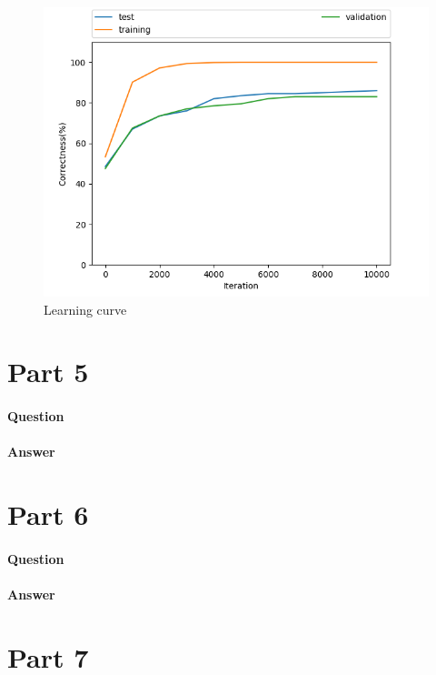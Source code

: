 \documentclass[11pt,twoside]{article}
\begin{document}
\begin{figure}[h]
	\centering
	\includegraphics[scale=0.8]{part4.png}
	\caption*{Learning curve}
\end{figure}

\clearpage

\section*{Part 5}
\paragraph{Question}


\paragraph{Answer}

\clearpage

\section*{Part 6}
\paragraph{Question}

\paragraph{Answer}


\clearpage

\section*{Part 7}
\end{document}
